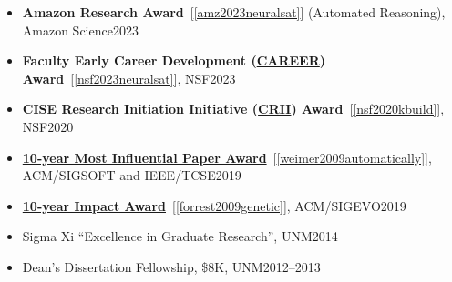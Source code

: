 \documentclass[11pt]{article}
\begin{document}
    \begin{itemize}
      \item \textbf{Amazon Research Award}~[\ref{amz2023neuralsat}] (Automated Reasoning), Amazon Science\hfill 2023
      \item \textbf{Faculty Early Career Development (\href{https://www.nsf.gov/awardsearch/showAward?AWD_ID=2238133}{CAREER}) Award}~[\ref{nsf2023neuralsat}], NSF\hfill 2023

      \item \textbf{CISE Research Initiation Initiative (\href{https://www.nsf.gov/awardsearch/showAward?AWD_ID=1948536}{CRII}) Award}~[\ref{nsf2020kbuild}], NSF\hfill 2020

      \item \href{https://www.sigsoft.org/awards/icseMIPAward.html}{\textbf{10-year Most Influential Paper Award}}~[\ref{weimer2009automatically}], ACM/SIGSOFT and IEEE/TCSE\hfill 2019


      \item \href{https://sig.sigevo.org/index.html/tiki-index.php?page=SIGEVO+Impact+Award}{\textbf{10-year Impact Award}}~[\ref{forrest2009genetic}], ACM/SIGEVO\hfill 2019

      \item  Sigma Xi ``Excellence in Graduate Research'', UNM\hfill 2014
      \item Dean's Dissertation Fellowship, \$8K, UNM\hfill 2012--2013


\end{itemize}
\end{document}
